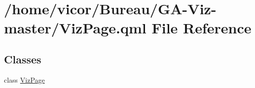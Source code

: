 \hypertarget{_viz_page_8qml}{}\section{/home/vicor/\+Bureau/\+G\+A-\/\+Viz-\/master/\+Viz\+Page.qml File Reference}
\label{_viz_page_8qml}
\subsection*{Classes}
\begin{DoxyCompactItemize}
\item 
class \hyperlink{class_viz_page}{Viz\+Page}
\end{DoxyCompactItemize}
